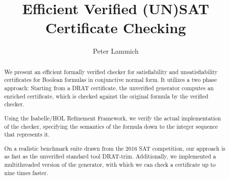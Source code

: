 \documentclass{llncs}
\begin{document}
\title{Efficient Verified (UN)SAT Certificate Checking}

\author{Peter Lammich}


\maketitle

\begin{abstract}
We present an efficient formally verified checker for satisfiability and unsatisfiability certificates for 
Boolean formulas in conjunctive normal form. 
It utilizes a two phase approach: Starting from a DRAT certificate, the unverified generator computes an enriched certificate,
which is checked against the original formula by the verified checker.

Using the Isabelle/HOL Refinement Framework, we verify the actual implementation of the checker, specifying the semantics of the formula down to the integer sequence that represents it.

On a realistic benchmark suite drawn from the 2016 SAT competition, our approach is as fast as the unverified standard tool DRAT-trim.
Additionally, we implemented a multithreaded version of the generator, with which we can check a certificate up to nine times faster.
\end{abstract}

% 
% 
\end{document}
